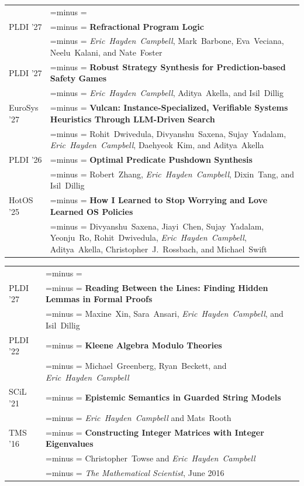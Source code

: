 \documentclass[letterpaper,10pt,oneside]{article}
\makeatletter
\newcommand{\pubtitle}[1]{\textbf{#1}}
\newcommand{\authors}[1]{#1}
\newcommand{\me}{\mbox{\textit{Eric Hayden Campbell}}}
\newcommand{\venuenote}[1]{\leavevmode{\footnotesize\itshape\color{black!70}#1}}
\newcommand{\distinguished}{\venuenote{\textbf{Distinguished Paper}}}
\newcommand{\underreview}{\venuenote{Under Review}}
\newlength{\leftcol}  \setlength{\leftcol}{1.05in}
\newlength{\colsep}   \setlength{\colsep}{1em}
\newlength{\rightcol}
\newcommand{\balancedrag}{%
  \setlength{\rightskip}{0pt plus 0.45\rightcol}%
  \setlength{\parfillskip}{0pt}%
  \spaceskip=\fontdimen2\font minus \fontdimen4\font
  \xspaceskip=\spaceskip
  \hbadness=10000 \hyphenpenalty=10000 \exhyphenpenalty=10000 \emergencystretch=0pt}
\newenvironment{cvsection}[1]
  {\par\vspace{0.9em}%
   \setlength{\rightcol}{\dimexpr\linewidth-\leftcol-\colsep\relax}%
   \noindent\begin{longtable}[l]{@{}>{\raggedleft\arraybackslash}p{\leftcol}@{\hspace{\colsep}}>{\raggedright\balancedrag\arraybackslash}p{\rightcol}@{}}
   \multicolumn{2}{@{}l}{\Large #1} \\*\noalign{\nobreak\vspace{0.4em}}}
  {\end{longtable}}
\newcommand{\gap}{\noalign{\vspace{0.4em}}}
\makeatother
\begin{document}
\begin{cvsection}{Publications: Formal Foundations for Adaptive Operating Systems}

  PLDI '27 & \pubtitle{Refractional Program Logic} \\*
  \underreview & \authors{\me, Mark~Barbone, Eva~Veciana, Neelu~Kalani, and Nate~Foster} \\
  \gap

  PLDI '27 & \pubtitle{Robust Strategy Synthesis for Prediction-based Safety Games} \\*
  \underreview & \authors{\me, Aditya~Akella, and Isil~Dillig} \\
  \gap

  EuroSys '27 & \pubtitle{Vulcan: Instance-Specialized, Verifiable Systems Heuristics Through LLM-Driven Search} \\*
  & \authors{Rohit~Dwivedula, Divyanshu~Saxena, Sujay~Yadalam, \me, Daehyeok~Kim, and Aditya~Akella} \\
  \gap

  PLDI '26 & \pubtitle{Optimal Predicate Pushdown Synthesis} \\*
  & \authors{Robert~Zhang, \me, Dixin~Tang, and Isil~Dillig} \\
  \gap

  HotOS '25 & \pubtitle{How I Learned to Stop Worrying and Love Learned OS Policies} \\*
  & \authors{Divyanshu~Saxena, Jiayi~Chen, Sujay~Yadalam, Yeonju~Ro, Rohit~Dwivedula, \me, Aditya~Akella, Christopher~J.~Rossbach, and Michael~Swift} \\

\end{cvsection}

\begin{cvsection}{Publications: Logic and Algebra}

  PLDI '27 & \pubtitle{Reading Between the Lines: Finding Hidden Lemmas in Formal Proofs} \\*
  \underreview & \authors{Maxine~Xin, Sara~Ansari, \me, and Isil~Dillig} \\
  \gap

  PLDI '22 & \pubtitle{Kleene Algebra Modulo Theories} \\*
  \distinguished & \authors{Michael~Greenberg, Ryan~Beckett, and \me} \\
  \gap

  SCiL '21 & \pubtitle{Epistemic Semantics in Guarded String Models} \\*
  & \authors{\me{} and Mats~Rooth} \\
  \gap

  TMS '16 & \pubtitle{Constructing Integer Matrices with Integer Eigenvalues} \\*
  & \authors{Christopher~Towse and \me} \\*
  & \textit{The Mathematical Scientist}, June 2016 \\

\end{cvsection}
\end{document}
